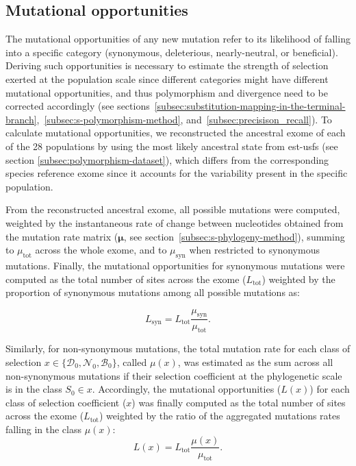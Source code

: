 \documentclass{article}
\newcommand{\UniDimArray}[1]{\bm{#1}}
\newcommand{\Sphy}{S_{0}}
\newcommand{\SphyDel}{\mathcal{D}_0}
\newcommand{\SphyNeu}{\mathcal{N}_0}
\newcommand{\SphyBen}{\mathcal{B}_0}
\newcommand{\Sphyclass}{x}
\begin{document}
    \subsection{Mutational opportunities}
    \label{subsec:nunber-of-sites}
    The mutational opportunities of any new mutation refer to its likelihood of falling into a specific category (synonymous, deleterious, nearly-neutral, or beneficial).
    Deriving such opportunities is necessary to estimate the strength of selection exerted at the population scale since different categories might have different mutational opportunities, and thus polymorphism and divergence need to be corrected accordingly (see sections~\ref{subsec:substitution-mapping-in-the-terminal-branch},~\ref{subsec:s-polymorphism-method}, and~\ref{subsec:precisison_recall}).
    To calculate mutational opportunities, we reconstructed the ancestral exome of each of the 28 populations by using the most likely ancestral state from est-usfs (see section \ref{subsec:polymorphism-dataset}), which differs from the corresponding species reference exome since it accounts for the variability present in the specific population.

    From the reconstructed ancestral exome, all possible mutations were computed, weighted by the instantaneous rate of change between nucleotides obtained from the mutation rate matrix ($\UniDimArray{\mu}$, see section~\ref{subsec:s-phylogeny-method}), summing to $\mu_{\text{tot}}$ across the whole exome, and to $\mu_{\text{syn}}$ when restricted to synonymous mutations.
    Finally, the mutational opportunities for synonymous mutations were computed as the total number of sites across the exome ($L_{\text{tot}}$) weighted by the proportion of synonymous mutations among all possible mutations as:

    \begin{equation}
        L_{\text{syn}} = L_{\text{tot}} \frac{\mu_{\text{syn}}}{\mu_{\text{tot}}}.
    \end{equation}

    Similarly, for non-synonymous mutations, the total mutation rate for each class of selection $\Sphyclass \in \{\SphyDel, \SphyNeu, \SphyBen \}$, called $\mu\left( \Sphyclass \right)$, was estimated as the sum across all non-synonymous mutations if their selection coefficient at the phylogenetic scale is in the class $\Sphy \in \Sphyclass$.
    Accordingly, the mutational opportunities ($L \left( \Sphyclass \right)$) for each class of selection coefficient ($\Sphyclass$) was finally computed as the total number of sites across the exome ($L_{\text{tot}}$) weighted by the ratio of the aggregated mutations rates falling in the class $\mu\left( \Sphyclass \right)$:
    \begin{equation}
        L \left( \Sphyclass \right) = L_{\text{tot}} \frac{\mu\left( \Sphyclass \right)}{\mu_{\text{tot}}}.\label{eq:mutation-opp}
    \end{equation}
\end{document}
